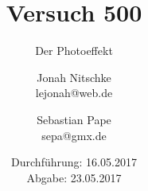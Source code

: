 

\title{Versuch 500}
\subtitle{Der Photoeffekt}
\author{Jonah Nitschke\\
        lejonah@web.de \and
        Sebastian Pape\\
        sepa@gmx.de}
\date{Durchführung: 16.05.2017\\
      Abgabe: 23.05.2017}



\maketitle
\newpage
\setcounter{page}{1}




\newpage

\printbibliography


